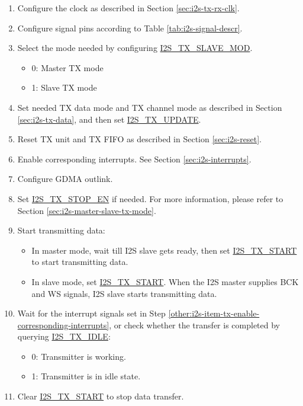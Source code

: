 \documentclass[main\_\_EN.tex]{subfiles}
\begin{document}
\begin{enumerate}
    \item Configure the clock as described in Section \ref{sec:i2s-tx-rx-clk}.
    \item Configure signal pins according to Table \ref{tab:i2s-signal-descr}.
    \item Select the mode needed by configuring \hyperref[fielddesc:I2STXSLAVEMOD]{I2S\_TX\_SLAVE\_MOD}.
    \begin{itemize}
        \item 0: Master TX mode
        \item 1: Slave TX mode
    \end{itemize}
    \item Set needed TX data mode and TX channel mode as described in Section \ref{sec:i2s-tx-data}, and then set \hyperref[fielddesc:I2STXUPDATE]{I2S\_TX\_UPDATE}.
    \item Reset TX unit and TX FIFO as described in Section \ref{sec:i2s-reset}.
    \item Enable corresponding interrupts. See Section \ref{sec:i2s-interrupts}.\label{other:i2s-item-tx-enable-corresponding-interrupts}
    \item Configure GDMA outlink. 
    \item Set \hyperref[fielddesc:I2STXSTOPEN]{I2S\_TX\_STOP\_EN} if needed. For more information, please refer to Section \ref{sec:i2s-master-slave-tx-mode}. 
    \item Start transmitting data:
    \begin{itemize}
        \item In master mode, wait till I2S slave gets ready, then set \hyperref[fielddesc:I2STXSTART]{I2S\_TX\_START} to start transmitting data.
        \item In slave mode, set \hyperref[fielddesc:I2STXSTART]{I2S\_TX\_START}. When the I2S master supplies BCK and WS signals, I2S slave starts transmitting data.
    \end{itemize}
    \item Wait for the interrupt signals set in Step \ref{other:i2s-item-tx-enable-corresponding-interrupts}, or check whether the transfer is completed by querying \hyperref[fielddesc:I2STXIDLE]{I2S\_TX\_IDLE}:
    \begin{itemize}
        \item 0: Transmitter is working.
        \item 1: Transmitter is in idle state.
    \end{itemize}
    \item Clear \hyperref[fielddesc:I2STXSTART]{I2S\_TX\_START} to stop data transfer.
\end{enumerate}
\end{document}
